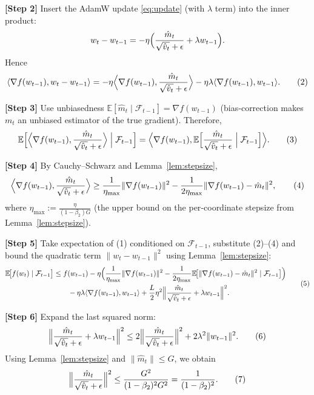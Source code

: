 \documentclass[11pt]{article}
\newcommand{\E}{\mathbb{E}}
\begin{document}
\noindent\textbf{[Step 2]} Insert the AdamW update \eqref{eq:update} (with $\lambda$ term) into the inner product:
\[
w_t-w_{t-1}= -\eta\Bigl(\frac{\hat m_{t}}{\sqrt{\hat v_{t}}+\epsilon}+\lambda w_{t-1}\Bigr).
\]
Hence
\[
\langle\nabla f(w_{t-1}),w_t-w_{t-1}\rangle
= -\eta\Bigl\langle\nabla f(w_{t-1}),\frac{\hat m_{t}}{\sqrt{\hat v_{t}}+\epsilon}\Bigr\rangle
-\eta\lambda\langle\nabla f(w_{t-1}),w_{t-1}\rangle.
\tag{2}
\]

\noindent\textbf{[Step 3]} Use unbiasedness $\E[\hat m_{t}\mid\mathcal{F}_{t-1}]=\nabla f(w_{t-1})$ (bias‑correction makes $m_t$ an unbiased estimator of the true gradient). Therefore,
\[
\E\Bigl[\Bigl\langle\nabla f(w_{t-1}),\frac{\hat m_{t}}{\sqrt{\hat v_{t}}+\epsilon}\Bigr\rangle\Bigm|\mathcal{F}_{t-1}\Bigr]
=
\Bigl\langle\nabla f(w_{t-1}),\E\Bigl[\frac{\hat m_{t}}{\sqrt{\hat v_{t}}+\epsilon}\Bigm|\mathcal{F}_{t-1}\Bigr]\Bigr\rangle.
\tag{3}
\]

\noindent\textbf{[Step 4]} By Cauchy–Schwarz and Lemma~\ref{lem:stepsize},
\[
\Bigl\langle\nabla f(w_{t-1}),\frac{\hat m_{t}}{\sqrt{\hat v_{t}}+\epsilon}\Bigr\rangle
\ge
\frac{1}{\eta_{\max}}\|\nabla f(w_{t-1})\|^{2}
-
\frac{1}{2\eta_{\max}}\|\nabla f(w_{t-1})-\hat m_{t}\|^{2},
\tag{4}
\]
where $\displaystyle \eta_{\max}:=\frac{\eta}{(1-\beta_2)G}$ (the upper bound on the per‑coordinate stepsize from Lemma~\ref{lem:stepsize}).

\noindent\textbf{[Step 5]} Take expectation of (1) conditioned on $\mathcal{F}_{t-1}$, substitute (2)–(4) and bound the quadratic term $\|w_t-w_{t-1}\|^{2}$ using Lemma~\ref{lem:stepsize}:
\[
\begin{aligned}
\E\!\bigl[f(w_t)\mid\mathcal{F}_{t-1}\bigr]
&\le f(w_{t-1})
-\eta\Bigl(\frac{1}{\eta_{\max}}\|\nabla f(w_{t-1})\|^{2}
-\frac{1}{2\eta_{\max}}\E\!\bigl[\|\nabla f(w_{t-1})-\hat m_{t}\|^{2}\mid\mathcal{F}_{t-1}\bigr]\Bigr) \\
&\qquad -\eta\lambda\langle\nabla f(w_{t-1}),w_{t-1}\rangle
+\frac{L}{2}\eta^{2}\Bigl\|\frac{\hat m_{t}}{\sqrt{\hat v_{t}}+\epsilon}+\lambda w_{t-1}\Bigr\|^{2}.
\end{aligned}
\tag{5}
\]

\noindent\textbf{[Step 6]} Expand the last squared norm:
\[
\Bigl\|\frac{\hat m_{t}}{\sqrt{\hat v_{t}}+\epsilon}+\lambda w_{t-1}\Bigr\|^{2}
\le
2\Bigl\|\frac{\hat m_{t}}{\sqrt{\hat v_{t}}+\epsilon}\Bigr\|^{2}
+2\lambda^{2}\|w_{t-1}\|^{2}.
\tag{6}
\]
Using Lemma~\ref{lem:stepsize} and $\|\hat m_{t}\|\le G$, we obtain
\[
\Bigl\|\frac{\hat m_{t}}{\sqrt{\hat v_{t}}+\epsilon}\Bigr\|^{2}
\le \frac{G^{2}}{(1-\beta_2)^{2}G^{2}} = \frac{1}{(1-\beta_2)^{2}}.
\tag{7}
\]
\end{document}
